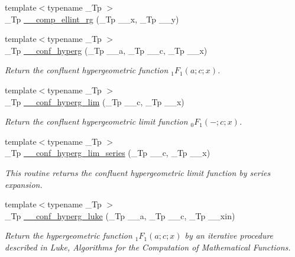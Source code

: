 \begin{DoxyCompactItemize}
\item 
{\footnotesize template$<$typename \+\_\+\+Tp $>$ }\\\+\_\+\+Tp \hyperlink{namespacestd_1_1____detail_a31bb5a6e359c88b5bece8dd73f76a2f9}{\+\_\+\+\_\+comp\+\_\+ellint\+\_\+rg} (\+\_\+\+Tp \+\_\+\+\_\+x, \+\_\+\+Tp \+\_\+\+\_\+y)
\item 
{\footnotesize template$<$typename \+\_\+\+Tp $>$ }\\\+\_\+\+Tp \hyperlink{namespacestd_1_1____detail_a3cb3151857e9ac01bc442c90301365ee}{\+\_\+\+\_\+conf\+\_\+hyperg} (\+\_\+\+Tp \+\_\+\+\_\+a, \+\_\+\+Tp \+\_\+\+\_\+c, \+\_\+\+Tp \+\_\+\+\_\+x)
\begin{DoxyCompactList}\small\item\em Return the confluent hypergeometric function $ _1F_1(a;c;x) $. \end{DoxyCompactList}\item 
{\footnotesize template$<$typename \+\_\+\+Tp $>$ }\\\+\_\+\+Tp \hyperlink{namespacestd_1_1____detail_adc839c2b3faad5d78bf64236c5c7af73}{\+\_\+\+\_\+conf\+\_\+hyperg\+\_\+lim} (\+\_\+\+Tp \+\_\+\+\_\+c, \+\_\+\+Tp \+\_\+\+\_\+x)
\begin{DoxyCompactList}\small\item\em Return the confluent hypergeometric limit function $ _0F_1(-;c;x) $. \end{DoxyCompactList}\item 
{\footnotesize template$<$typename \+\_\+\+Tp $>$ }\\\+\_\+\+Tp \hyperlink{namespacestd_1_1____detail_a44b73ec79e0a8cfd1f29a21cb39f2bdc}{\+\_\+\+\_\+conf\+\_\+hyperg\+\_\+lim\+\_\+series} (\+\_\+\+Tp \+\_\+\+\_\+c, \+\_\+\+Tp \+\_\+\+\_\+x)
\begin{DoxyCompactList}\small\item\em This routine returns the confluent hypergeometric limit function by series expansion. \end{DoxyCompactList}\item 
{\footnotesize template$<$typename \+\_\+\+Tp $>$ }\\\+\_\+\+Tp \hyperlink{namespacestd_1_1____detail_ac3b4c72998f9d7deb6d79bda93220e58}{\+\_\+\+\_\+conf\+\_\+hyperg\+\_\+luke} (\+\_\+\+Tp \+\_\+\+\_\+a, \+\_\+\+Tp \+\_\+\+\_\+c, \+\_\+\+Tp \+\_\+\+\_\+xin)
\begin{DoxyCompactList}\small\item\em Return the hypergeometric function $ _1F_1(a;c;x) $ by an iterative procedure described in Luke, Algorithms for the Computation of Mathematical Functions. \end{DoxyCompactList}\item 

\end{DoxyCompactItemize}
